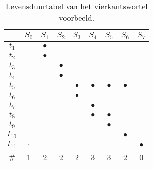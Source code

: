 \begin{table}[hbt]
\centering
\begin{tabular}{c|cccccccc}
&$S_0$&$S_1$&$S_2$&$S_3$&$S_4$&$S_5$&$S_6$&$S_7$\\\hline
$t_1$&	&$\bullet$&	&	&	&	&	&\\
$t_2$&	&$\bullet$&	&	&	&	&	&\\
$t_3$&	&	&$\bullet$&	&	&	&	&\\
$t_4$&	&	&$\bullet$&	&	&	&	&\\
$t_5$&	&	&	&$\bullet$&$\bullet$&$\bullet$&$\bullet$&\\
$t_6$&	&	&	&$\bullet$&	&	&	&\\
$t_7$&	&	&	&	&$\bullet$&	&	&\\
$t_8$&	&	&	&	&$\bullet$&$\bullet$&	&\\
$t_9$&	&	&	&	&	&$\bullet$&	&\\
$t_{10}$&	&	&	&	&	&	&$\bullet$&\\
$t_{11}$&$\cdot$&	&	&	&	&	&	&$\bullet$\\\hline
$\#$&1&2&2&2&3&3&2&0\\
\end{tabular}
\caption{Levensduurtabel van het vierkantswortel voorbeeld.}
\label{tbl:variableLifespanExample}
\end{table}
